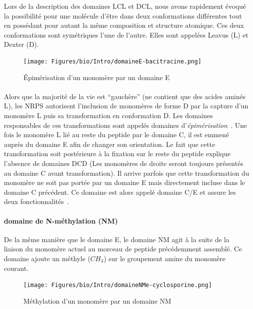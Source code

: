 \documentclass[12pt,french,twoside]{report}
\begin{document}
Lors de la description des domaines LCL et DCL, nous avons rapidement évoqué la possibilité pour une molécule d'être dans deux conformations différentes tout en possédant pour autant la même composition et structure atomique.
Ces deux conformations sont symétriques l'une de l'autre.
Elles sont appelées Leavus (L) et Dexter (D).

\begin{figure}[h!]
  \begin{center}
    \texttt{[image: Figures/bio/Intro/domaineE-bacitracine.png]}
    \caption{\label{domaine_E}Épimérisation d'un monomère par un domaine E}
  \end{center}
\end{figure}

\paragraph{}Alors que la majorité de la vie est ``gauchère'' (ne contient que des acides aminés L), les NRPS autorisent l'inclusion de monomères de forme D par la capture d'un monomère L puis sa transformation en conformation D.
Les domaines responsables de ces transformations sont appelés domaines d'\textit{épimérisation}~\cite{calcott_portability_2015}.
Une fois le monomère L lié au reste du peptide par le domaine C, il est emmené auprès du domaine E afin de changer son orientation.
Le fait que cette transformation soit postérieure à la fixation sur le reste du peptide explique l'absence de domaines DCD (Les monomères de droite seront toujours présentés au domaine C avant transformation).
Il arrive parfois que cette transformation du monomère ne soit pas portée par un domaine E mais directement incluse dans le domaine C précédent.
Ce domaine est alors appelé domaine C/E et assure les deux fonctionnalités~\cite{yin_enduracidin_2006,balibar_generation_2005}.


\paragraph{domaine de N-méthylation (NM)}

De la même manière que le domaine E, le domaine NM agit à la suite de la liaison du monomère actuel au morceau de peptide précédemment assemblé.
Ce domaine ajoute un méthyle ($CH_{3}$) sur le groupement amine du monomère courant.

\begin{figure}[h!]
  \begin{center}
    \texttt{[image: Figures/bio/Intro/domaineNMe-cyclosporine.png]}
    \caption{\label{domaine_NMe}Méthylation d'un monomère par un domaine NM}
  \end{center}
\end{figure}
\end{document}
